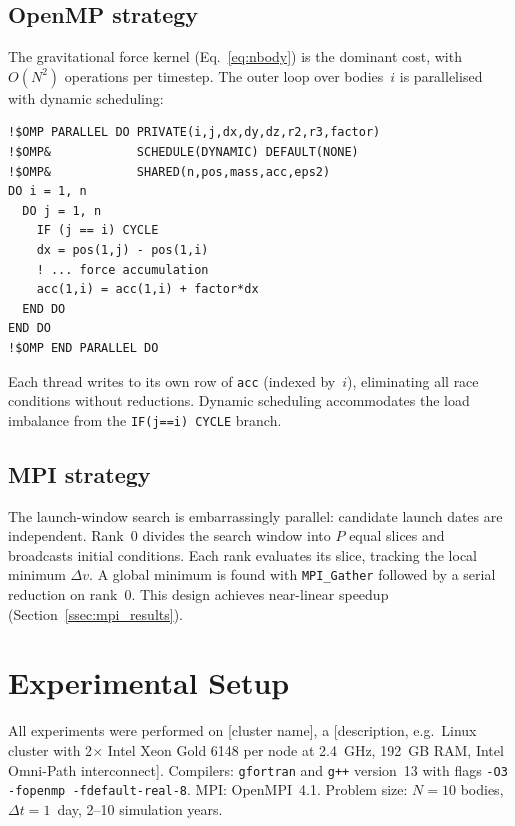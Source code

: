 \documentclass[conference]{IEEEtran}
\begin{document}
\subsection{OpenMP strategy}

The gravitational force kernel (Eq.~\ref{eq:nbody}) is the
dominant cost, with $O(N^2)$ operations per timestep.  The
outer loop over bodies~$i$ is parallelised with dynamic
scheduling:

\begin{lstlisting}[caption={OpenMP force kernel (Fortran)},label={lst:force}]
!$OMP PARALLEL DO PRIVATE(i,j,dx,dy,dz,r2,r3,factor)
!$OMP&            SCHEDULE(DYNAMIC) DEFAULT(NONE)
!$OMP&            SHARED(n,pos,mass,acc,eps2)
DO i = 1, n
  DO j = 1, n
    IF (j == i) CYCLE
    dx = pos(1,j) - pos(1,i)
    ! ... force accumulation
    acc(1,i) = acc(1,i) + factor*dx
  END DO
END DO
!$OMP END PARALLEL DO
\end{lstlisting}

Each thread writes to its own row of \texttt{acc}
(indexed by~$i$), eliminating all race conditions
without reductions.  Dynamic scheduling accommodates
the load imbalance from the \texttt{IF(j==i) CYCLE}
branch.

\subsection{MPI strategy}

The launch-window search is embarrassingly parallel:
candidate launch dates are independent.  Rank~0 divides
the search window into $P$ equal slices and broadcasts
initial conditions.  Each rank evaluates its slice,
tracking the local minimum $\Delta v$.  A global minimum
is found with \texttt{MPI\_Gather} followed by a serial
reduction on rank~0.  This design achieves near-linear
speedup (Section~\ref{ssec:mpi_results}).

\section{Experimental Setup}
\label{sec:setup}

All experiments were performed on [cluster name], a
[description, e.g.\ Linux cluster with 2$\times$ Intel
Xeon Gold 6148 per node at \SI{2.4}{GHz}, 192~GB RAM,
Intel Omni-Path interconnect].  Compilers: \texttt{gfortran}
and \texttt{g++} version~13 with flags
\texttt{-O3 -fopenmp -fdefault-real-8}.  MPI:
OpenMPI~4.1.  Problem size: $N=10$ bodies,
$\Delta t = 1$~day, 2--10 simulation years.
\end{document}
